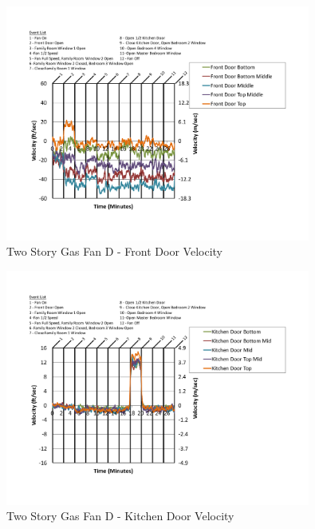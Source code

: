 \documentclass{article}
\begin{document}
\begin{appendices}
	\begin{figure}[H]
		\centering
		\includegraphics[height=3.05in,trim=0.67in 1.1in 0.67in 0.8in,clip=true]{0_Images/Results_Charts/ColdFlow/Two_Story/Gas/D/Front_Door_Velocity.pdf}
		\caption{Two Story Gas Fan D - Front Door Velocity}
	\end{figure}
 

	\begin{figure}[H]
		\centering
		\includegraphics[height=3.05in,trim=0.67in 1.1in 0.67in 0.8in,clip=true]{0_Images/Results_Charts/ColdFlow/Two_Story/Gas/D/Kitchen_Door_Velocity.pdf}
		\caption{Two Story Gas Fan D - Kitchen Door Velocity}
	\end{figure}
 
	\clearpage


\end{appendices}
\end{document}
